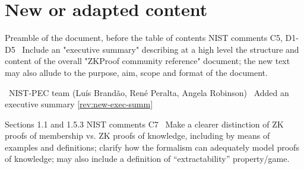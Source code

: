 


\section*{New or adapted content}
\label{sec:comments:contributed-content}


Preamble of the document, before the table of contents
\newcol \ccontext NIST comments C5, D1-D5 %
				\propContrib\ Include an "executive summary" describing at a high level the structure and content of the overall "ZKProof community reference" document; the new text may also allude to the purpose, aim, scope and format of the document.
				
\newcol {}
\newcol \contributors\ NIST-PEC team (Luís Brandão, René Peralta, Angela Robinson)
				\Chan\ Added an executive summary
\newcol \ref{rev:new-exec-summ}
\rowendL
\myendIssue



Sections 1.1 and 1.5.3
\newcol \ccontext NIST comments C7
				\propContrib\ Make a clearer distinction of ZK proofs of membership vs. ZK proofs of knowledge, including by means of examples and definitions; clarify how the formalism can adequately model proofs of knowledge; may also include a definition of ``extractability'' property/game.
				
